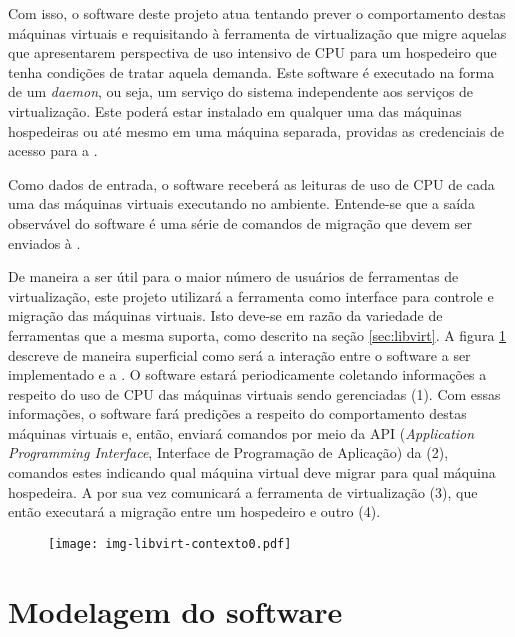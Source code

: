 Com isso, o software deste projeto atua tentando prever o comportamento
destas máquinas virtuais e requisitando à ferramenta de virtualização que
migre aquelas que apresentarem perspectiva de uso intensivo de CPU para um
hospedeiro que tenha condições de tratar aquela demanda. Este software é
executado na forma de um \emph{daemon}, ou seja, um serviço do sistema
independente aos serviços de virtualização. Este poderá estar instalado em
qualquer uma das máquinas hospedeiras ou até mesmo em uma máquina separada,
providas as credenciais de acesso para a \libvirt{}.

Como dados de entrada, o software receberá as leituras de uso de CPU de cada
uma das máquinas virtuais executando no ambiente. Entende-se que a saída
observável do software é uma série de comandos de migração que devem ser
enviados à \libvirt{}.

De maneira a ser útil para o maior número de usuários de ferramentas de
virtualização, este projeto utilizará a ferramenta \libvirt{} como interface
para controle e migração das máquinas virtuais. Isto deve-se em razão da
variedade de ferramentas que a mesma suporta, como descrito na seção
\ref{sec:libvirt}. A figura \ref{fig:libvirtcontexto0} descreve de maneira
superficial como será a interação entre o software a ser implementado e a
\libvirt{}. O software estará periodicamente coletando informações a respeito
do uso de CPU das máquinas virtuais sendo gerenciadas (1). Com essas
informações, o software fará predições a respeito do comportamento destas
máquinas virtuais e, então, enviará comandos por meio da API (\emph{Application
Programming Interface}, Interface de Programação de Aplicação) da \libvirt{}
(2), comandos estes indicando qual máquina virtual deve migrar para qual
máquina hospedeira. A \libvirt{} por sua vez comunicará a ferramenta de
virtualização (3), que então executará a migração entre um hospedeiro e outro
(4).

\begin{figure}[htp]
\centering
\texttt{[image: img-libvirt-contexto0.pdf]}
\label{fig:libvirtcontexto0}
\end{figure}


\section{Modelagem do software}\label{sec:modelagem}

